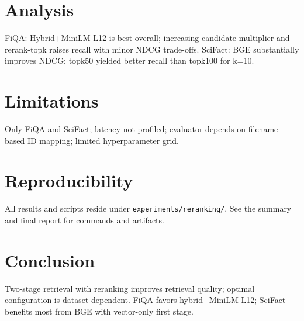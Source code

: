\documentclass[conference]{IEEEtran}
\begin{document}
\section{Analysis}
FiQA: Hybrid+MiniLM-L12 is best overall; increasing candidate multiplier and rerank-topk raises recall with minor NDCG trade-offs. SciFact: BGE substantially improves NDCG; topk50 yielded better recall than topk100 for k=10.

\section{Limitations}
Only FiQA and SciFact; latency not profiled; evaluator depends on filename-based ID mapping; limited hyperparameter grid.

\section{Reproducibility}
All results and scripts reside under \texttt{experiments/reranking/}. See the summary and final report for commands and artifacts.

\section{Conclusion}
Two-stage retrieval with reranking improves retrieval quality; optimal configuration is dataset-dependent. FiQA favors hybrid+MiniLM-L12; SciFact benefits most from BGE with vector-only first stage.



\end{document}
